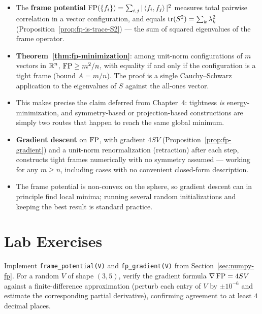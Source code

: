 \begin{itemize}
  \item The \textbf{frame potential} $\operatorname{FP}(\{f_i\}) = \sum_{i,j}
        |\left\langle f_i, f_j \right\rangle|^2$ measures total pairwise correlation in a
        vector configuration, and equals $\operatorname{tr}(S^2) = \sum_k\lambda_k^2$
        (Proposition~\ref{prop:fp-is-trace-S2}) --- the sum of squared
        eigenvalues of the frame operator.
  \item \textbf{Theorem~\ref{thm:fp-minimization}}: among unit-norm
        configurations of $m$ vectors in $\mathbb{R}^n$, $\operatorname{FP}\ge m^2/n$, with
        equality if and only if the configuration is a tight frame
        (bound $A=m/n$). The proof is a single Cauchy--Schwarz
        application to the eigenvalues of $S$ against the all-ones
        vector.
  \item This makes precise the claim deferred from Chapter~4: tightness
        \emph{is} energy-minimization, and symmetry-based or
        projection-based constructions are simply two routes that
        happen to reach the same global minimum.
  \item \textbf{Gradient descent} on $\operatorname{FP}$, with gradient $4SV$
        (Proposition~\ref{prop:fp-gradient}) and a unit-norm
        renormalization (retraction) after each step, constructs tight
        frames numerically with no symmetry assumed --- working for any
        $m\ge n$, including cases with no convenient closed-form
        description.
  \item The frame potential is non-convex on the sphere, so gradient
        descent can in principle find local minima; running several
        random initializations and keeping the best result is standard
        practice.
\end{itemize}

\section{Lab Exercises}
\label{sec:lab-ch8}

\begin{exercisebox}[title={Lab Exercise 8.1: Verifying the Gradient Formula}]
Implement \texttt{frame\_potential(V)} and \texttt{fp\_gradient(V)} from
Section~\ref{sec:numpy-fp}. For a random $V$ of shape $(3,5)$, verify
the gradient formula $\nabla\operatorname{FP}=4SV$ against a finite-difference
approximation (perturb each entry of $V$ by $\pm10^{-6}$ and estimate
the corresponding partial derivative), confirming agreement to at least
$4$ decimal places.
\end{exercisebox}

